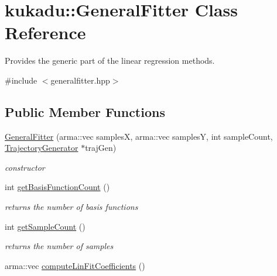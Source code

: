 \hypertarget{classkukadu_1_1GeneralFitter}{\section{kukadu\-:\-:General\-Fitter Class Reference}
\label{classkukadu_1_1GeneralFitter}
}


Provides the generic part of the linear regression methods.  




{\ttfamily \#include $<$generalfitter.\-hpp$>$}

\subsection*{Public Member Functions}
\begin{DoxyCompactItemize}
\item 
\hyperlink{classkukadu_1_1GeneralFitter_a6546135463b8ae78e707a5538166d545}{General\-Fitter} (arma\-::vec samples\-X, arma\-::vec samples\-Y, int sample\-Count, \hyperlink{classkukadu_1_1TrajectoryGenerator}{Trajectory\-Generator} $\ast$traj\-Gen)
\begin{DoxyCompactList}\small\item\em constructor \end{DoxyCompactList}\item 
\hypertarget{classkukadu_1_1GeneralFitter_ac87a8f6d6e036c424dd022808876421f}{int \hyperlink{classkukadu_1_1GeneralFitter_ac87a8f6d6e036c424dd022808876421f}{get\-Basis\-Function\-Count} ()}\label{classkukadu_1_1GeneralFitter_ac87a8f6d6e036c424dd022808876421f}

\begin{DoxyCompactList}\small\item\em returns the number of basis functions \end{DoxyCompactList}\item 
\hypertarget{classkukadu_1_1GeneralFitter_ab5aad99091bf484941090ce2dcaf9881}{int \hyperlink{classkukadu_1_1GeneralFitter_ab5aad99091bf484941090ce2dcaf9881}{get\-Sample\-Count} ()}\label{classkukadu_1_1GeneralFitter_ab5aad99091bf484941090ce2dcaf9881}

\begin{DoxyCompactList}\small\item\em returns the number of samples \end{DoxyCompactList}\item 
\hypertarget{classkukadu_1_1GeneralFitter_ad83ff2da0b13813710684596ee4e28df}{arma\-::vec \hyperlink{classkukadu_1_1GeneralFitter_ad83ff2da0b13813710684596ee4e28df}{compute\-Lin\-Fit\-Coefficients} ()}\label{classkukadu_1_1GeneralFitter_ad83ff2da0b13813710684596ee4e28df}


\end{DoxyCompactItemize}
